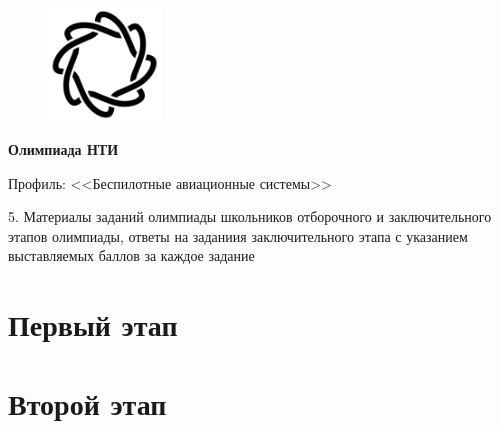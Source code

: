 \documentclass[a4paper,12pt,oneside]{book}
\begin{document}
\begin{titlepage}
        
        \begin{figure}
            \vspace{-80pt}
            \begin{center}
                \includegraphics[width=3cm]{tasks/NTI_logo_black}
            \end{center}
            \vspace{-20pt}
        \end{figure}
        
        \hspace{-90pt}\fontsize{28}{0}\textbf{Олимпиада НТИ}
        \vspace{1cm}

        \begin{center}
            \huge{Профиль: <<Беспилотные авиационные системы>>} \\
        \end{center}

        \noindent\large{5. Материалы заданий олимпиады школьников отборочного и заключительного этапов олимпиады, ответы на заданиия заключительного этапа с указанием выставляемых баллов за каждое задание}
\end{titlepage}

\setcounter{tocdepth}{1}

\tableofcontents

\part{Первый этап}




\part{Второй этап}
\clearpage


\end{document}
